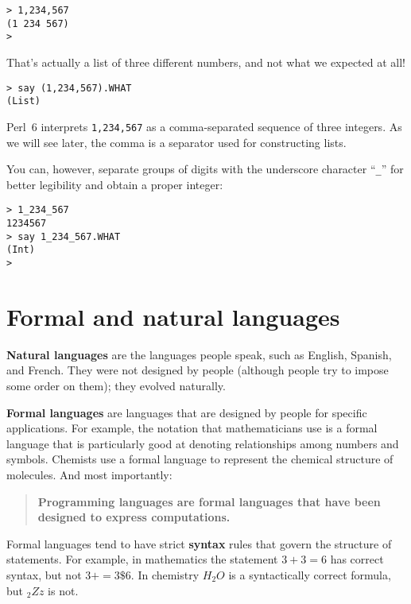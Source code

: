 \begin{verbatim}
> 1,234,567
(1 234 567)
>
\end{verbatim}
%
That's actually a list of three different numbers, and not what 
we expected at all! 

\begin{verbatim}
> say (1,234,567).WHAT
(List)
\end{verbatim}

Perl~6 interprets {\tt 1,234,567} as a comma-separated 
sequence of three integers.  As we will see later, 
the comma is a separator used for constructing lists.

You can, however, separate groups of digits with the underscore character ``\verb"_"'' for better legibility and obtain a 
proper integer:

\begin{verbatim}
> 1_234_567
1234567
> say 1_234_567.WHAT
(Int)
>
\end{verbatim}
%




\section{Formal and natural languages}

{\bf Natural languages} are the languages people speak,
such as English, Spanish, and French.  They were not designed
by people (although people try to impose some order on them);
they evolved naturally.

{\bf Formal languages} are languages that are designed by people for
specific applications.  For example, the notation that mathematicians
use is a formal language that is particularly good at denoting
relationships among numbers and symbols.  Chemists use a formal
language to represent the chemical structure of molecules.  And
most importantly:

\begin{quote}
{\bf Programming languages are formal languages that have been
designed to express computations.}
\end{quote}

Formal languages tend to have strict {\bf syntax} rules that
govern the structure of statements.
For example, in mathematics the statement
$3 + 3 = 6$ has correct syntax, but
not $3 + = 3 \$ 6$.  In chemistry
$H_2O$ is a syntactically correct formula, but $_2Zz$ is not.

